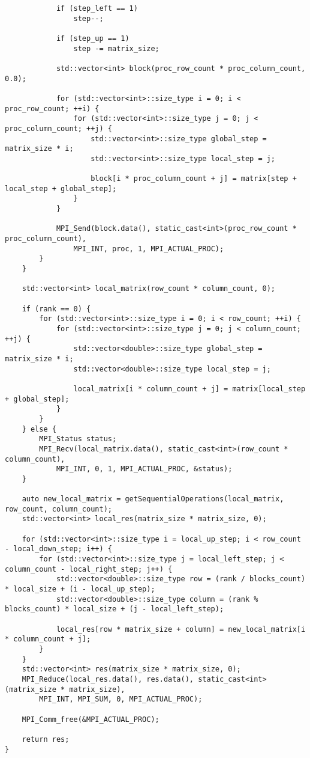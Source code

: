 \documentclass{report}
\begin{document}
\begin{lstlisting}
            if (step_left == 1)
                step--;

            if (step_up == 1)
                step -= matrix_size;

            std::vector<int> block(proc_row_count * proc_column_count, 0.0);

            for (std::vector<int>::size_type i = 0; i < proc_row_count; ++i) {
                for (std::vector<int>::size_type j = 0; j < proc_column_count; ++j) {
                    std::vector<int>::size_type global_step = matrix_size * i;
                    std::vector<int>::size_type local_step = j;

                    block[i * proc_column_count + j] = matrix[step + local_step + global_step];
                }
            }

            MPI_Send(block.data(), static_cast<int>(proc_row_count * proc_column_count),
                MPI_INT, proc, 1, MPI_ACTUAL_PROC);
        }
    }

    std::vector<int> local_matrix(row_count * column_count, 0);

    if (rank == 0) {
        for (std::vector<int>::size_type i = 0; i < row_count; ++i) {
            for (std::vector<int>::size_type j = 0; j < column_count; ++j) {
                std::vector<double>::size_type global_step = matrix_size * i;
                std::vector<double>::size_type local_step = j;

                local_matrix[i * column_count + j] = matrix[local_step + global_step];
            }
        }
    } else {
        MPI_Status status;
        MPI_Recv(local_matrix.data(), static_cast<int>(row_count * column_count),
            MPI_INT, 0, 1, MPI_ACTUAL_PROC, &status);
    }

    auto new_local_matrix = getSequentialOperations(local_matrix, row_count, column_count);
    std::vector<int> local_res(matrix_size * matrix_size, 0);

    for (std::vector<int>::size_type i = local_up_step; i < row_count - local_down_step; i++) {
        for (std::vector<int>::size_type j = local_left_step; j < column_count - local_right_step; j++) {
            std::vector<double>::size_type row = (rank / blocks_count) * local_size + (i - local_up_step);
            std::vector<double>::size_type column = (rank % blocks_count) * local_size + (j - local_left_step);

            local_res[row * matrix_size + column] = new_local_matrix[i * column_count + j];
        }
    }
    std::vector<int> res(matrix_size * matrix_size, 0);
    MPI_Reduce(local_res.data(), res.data(), static_cast<int>(matrix_size * matrix_size),
        MPI_INT, MPI_SUM, 0, MPI_ACTUAL_PROC);

    MPI_Comm_free(&MPI_ACTUAL_PROC);

    return res;
}
\end{lstlisting}
\end{document}
